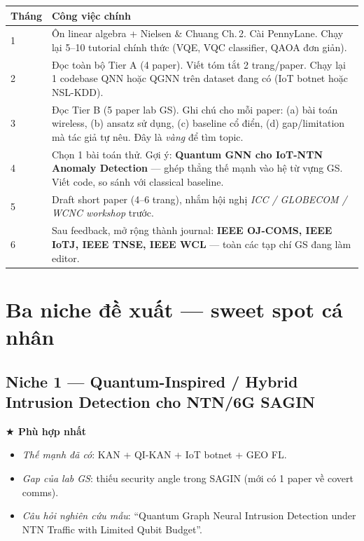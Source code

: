 \documentclass[11pt,a4paper]{article}
\begin{document}
\begin{longtable}{@{}p{1.2cm} p{14cm}@{}}
\toprule
\textbf{Tháng} & \textbf{Công việc chính} \\
\midrule
\endhead
1 & Ôn linear algebra + Nielsen \& Chuang Ch.\,2. Cài PennyLane. Chạy lại 5--10 tutorial chính thức (VQE, VQC classifier, QAOA đơn giản). \\
2 & Đọc toàn bộ Tier A (4 paper). Viết tóm tắt 2 trang/paper. Chạy lại 1 codebase QNN hoặc QGNN trên dataset đang có (IoT botnet hoặc NSL-KDD). \\
3 & Đọc Tier B (5 paper lab GS). Ghi chú cho mỗi paper: (a) bài toán wireless, (b) ansatz sử dụng, (c) baseline cổ điển, (d) gap/limitation mà tác giả tự nêu. Đây là \textit{vàng} để tìm topic. \\
4 & Chọn 1 bài toán thử. Gợi ý: \textbf{Quantum GNN cho IoT-NTN Anomaly Detection} --- ghép thẳng thế mạnh vào hệ từ vựng GS. Viết code, so sánh với classical baseline. \\
5 & Draft short paper (4--6 trang), nhắm hội nghị \textit{ICC / GLOBECOM / WCNC workshop} trước. \\
6 & Sau feedback, mở rộng thành journal: \textbf{IEEE OJ-COMS, IEEE IoTJ, IEEE TNSE, IEEE WCL} --- toàn các tạp chí GS đang làm editor. \\
\bottomrule
\end{longtable}

\section{Ba niche đề xuất --- sweet spot cá nhân}

\subsection{Niche 1 --- Quantum-Inspired / Hybrid Intrusion Detection cho NTN/6G SAGIN}
\textbf{\color{accent2}$\bigstar$ Phù hợp nhất}
\begin{itemize}
  \item \textit{Thế mạnh đã có}: KAN + QI-KAN + IoT botnet + GEO FL.
  \item \textit{Gap của lab GS}: thiếu security angle trong SAGIN (mới có 1 paper về covert comms).
  \item \textit{Câu hỏi nghiên cứu mẫu}: ``Quantum Graph Neural Intrusion Detection under NTN Traffic with Limited Qubit Budget''.
\end{itemize}
\end{document}
